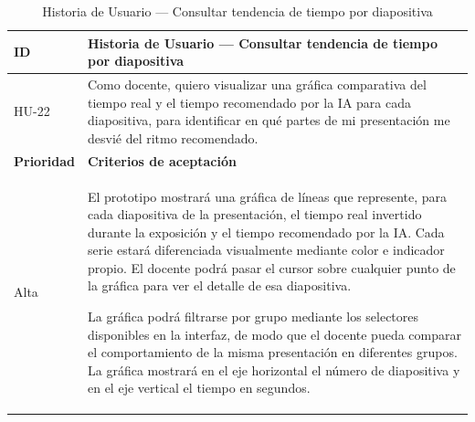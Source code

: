 \documentclass[11pt]{article}
\newcommand{\ttstyle}{%
  \small
  \setlength{\tabcolsep}{6pt}%
  \renewcommand{\arraystretch}{1.25}%
  \arrayrulecolor{azulprofundo}%
}
\newcommand{\hairrule}{%
  \arrayrulecolor{azulregla}\midrule[0.3pt]\arrayrulecolor{azulprofundo}%
}
\begin{document}
\begin{table}[H]
    \centering
    \renewcommand{\arraystretch}{1.2}
    \ttstyle
    \begin{tabular}{p{2.5cm}p{11cm}}
        \toprule
        \textbf{ID} & \textbf{Historia de Usuario --- Consultar tendencia de tiempo por diapositiva} \\
        \midrule
        HU-22 & Como docente, quiero visualizar una gráfica comparativa del tiempo real y el tiempo recomendado por la IA para cada diapositiva, para identificar en qué partes de mi presentación me desvié del ritmo recomendado. \\
        \hairrule
        \textbf{Prioridad} & \textbf{Criterios de aceptación} \\
        \hairrule
        Alta & El prototipo mostrará una gráfica de líneas que represente, para cada diapositiva de la presentación, el tiempo real invertido durante la exposición y el tiempo recomendado por la IA. Cada serie estará diferenciada visualmente mediante color e indicador propio. El docente podrá pasar el cursor sobre cualquier punto de la gráfica para ver el detalle de esa diapositiva.

        La gráfica podrá filtrarse por grupo mediante los selectores disponibles en la interfaz, de modo que el docente pueda comparar el comportamiento de la misma presentación en diferentes grupos. La gráfica mostrará en el eje horizontal el número de diapositiva y en el eje vertical el tiempo en segundos. \\
        \bottomrule
    \end{tabular}
    \caption{Historia de Usuario --- Consultar tendencia de tiempo por diapositiva}
    \label{tab:hu-consultar-tendencia-tiempo}
\end{table}
\end{document}
